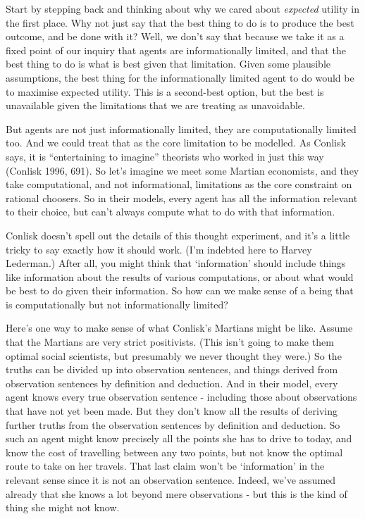 \documentclass[
  12pt,
]{article}
\begin{document}
Start by stepping back and thinking about why we cared about \emph{expected} utility in the first place. Why not just say that the best thing to do is to produce the best outcome, and be done with it? Well, we don't say that because we take it as a fixed point of our inquiry that agents are informationally limited, and that the best thing to do is what is best given that limitation. Given some plausible assumptions, the best thing for the informationally limited agent to do would be to maximise expected utility. This is a second-best option, but the best is unavailable given the limitations that we are treating as unavoidable.

But agents are not just informationally limited, they are computationally limited too. And we could treat that as the core limitation to be modelled. As Conlisk says, it is ``entertaining to imagine'' theorists who worked in just this way (Conlisk 1996, 691). So let's imagine we meet some Martian economists, and they take computational, and not informational, limitations as the core constraint on rational choosers. So in their models, every agent has all the information relevant to their choice, but can't always compute what to do with that information.

Conlisk doesn't spell out the details of this thought experiment, and it's a little tricky to say exactly how it should work. (I'm indebted here to Harvey Lederman.) After all, you might think that `information' should include things like information about the results of various computations, or about what would be best to do given their information. So how can we make sense of a being that is computationally but not informationally limited?

Here's one way to make sense of what Conlisk's Martians might be like. Assume that the Martians are very strict positivists. (This isn't going to make them optimal social scientists, but presumably we never thought they were.) So the truths can be divided up into observation sentences, and things derived from observation sentences by definition and deduction. And in their model, every agent knows every true observation sentence - including those about observations that have not yet been made. But they don't know all the results of deriving further truths from the observation sentences by definition and deduction. So such an agent might know precisely all the points she has to drive to today, and know the cost of travelling between any two points, but not know the optimal route to take on her travels. That last claim won't be `information' in the relevant sense since it is not an observation sentence. Indeed, we've assumed already that she knows a lot beyond mere observations - but this is the kind of thing she might not know.
\end{document}
